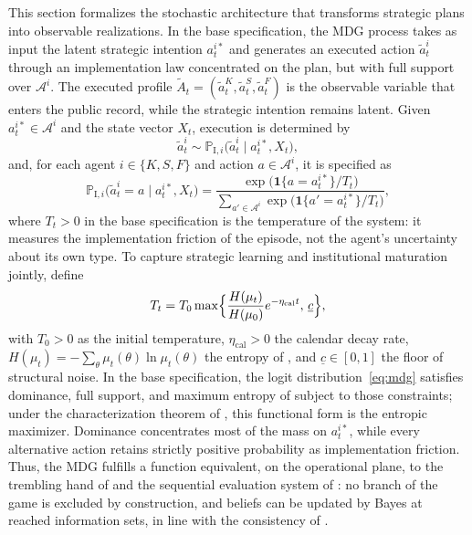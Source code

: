 \documentclass[review,authoryear,12pt]{elsarticle}
\theoremstyle{plain}
\theoremstyle{definition}
\newcommand{\1}{\mathbf{1}}
\newcommand{\ProbI}[1]{\mathbb{P}_{\mathrm{I},#1}}
\begin{document}
This section formalizes the stochastic architecture that transforms strategic plans into observable realizations. In the base specification, the MDG process takes as input the latent strategic intention $a_t^{i\ast}$ and generates an executed action $\tilde{a}_t^i$ through an implementation law concentrated on the plan, but with full support over $\mathcal{A}^i$. The executed profile $\tilde{A}_t=(\tilde{a}_t^K,\tilde{a}_t^S,\tilde{a}_t^F)$ is the observable variable that enters the public record, while the strategic intention remains latent. Given $a_t^{i\ast}\in\mathcal{A}^i$ and the state vector $X_t$, execution is determined by
\[
\tilde{a}_t^i\sim\ProbI{i}\bigl(\tilde{a}_t^i\mid a_t^{i\ast},X_t\bigr),
\]
and, for each agent $i\in\{K,S,F\}$ and action $a\in\mathcal{A}^i$, it is specified as
\begin{equation}
\ProbI{i}\bigl(\tilde{a}_t^i=a\mid a_t^{i\ast},X_t\bigr)
=\frac{\exp\bigl(\mathbf{1}\{a=a_t^{i\ast}\}/T_t\bigr)}{\sum_{a'\in\mathcal{A}^i}\exp\bigl(\mathbf{1}\{a'=a_t^{i\ast}\}/T_t\bigr)},
\label{eq:mdg}
\end{equation}
where $T_t>0$ in the base specification is the temperature of the system: it measures the implementation friction of the episode, not the agent's uncertainty about its own type. To capture strategic learning and institutional maturation jointly, define
\begin{equation}
T_t=T_0\max\Bigl\{\frac{H(\mu_t)}{H(\mu_0)}e^{-\eta_{\mathrm{cal}}t},\,\underline{c}\Bigr\},
\label{eq:temperature}
\end{equation}
with $T_0>0$ as the initial temperature, $\eta_{\mathrm{cal}}>0$ the calendar decay rate, $H(\mu_t)=-\sum_\theta\mu_t(\theta)\ln\mu_t(\theta)$ the entropy of \citet{Shannon1948}, and $\underline{c}\in[0,1]$ the floor of structural noise. In the base specification, the logit distribution~\eqref{eq:mdg} satisfies dominance, full support, and maximum entropy of \citet{Shannon1948} subject to those constraints; under the characterization theorem of \citet{Jaynes1957Information}, this functional form is the entropic maximizer. Dominance concentrates most of the mass on $a_t^{i\ast}$, while every alternative action retains strictly positive probability as implementation friction. Thus, the MDG fulfills a function equivalent, on the operational plane, to the trembling hand of \citet{Selten1975Perfectness} and the sequential evaluation system of \citet{KrepsWilson1982}: no branch of the game is excluded by construction, and beliefs can be updated by Bayes at reached information sets, in line with the consistency of \citet{FudenbergTirole1991PBE}.
\end{document}
